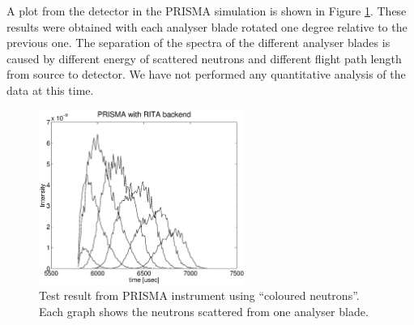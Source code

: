 A plot from the detector in the PRISMA simulation is shown in Figure
\ref{f:PRISMAdata}. These results were obtained with each analyser blade
rotated one degree relative to the previous one. The separation of the
spectra of the different analyser blades is caused by different energy
of scattered neutrons and different flight path length from source to
detector.  We have not performed any quantitative analysis of the data at this
time.

\begin{figure}
  \begin{center}
    \includegraphics[width=0.6\textwidth]{figures/prisma2-a.eps}
  \end{center}
\caption{Test result from PRISMA instrument using ``coloured
  neutrons''. Each graph shows the neutrons scattered from one analyser blade.}
\label{f:PRISMAdata}
\end{figure}

